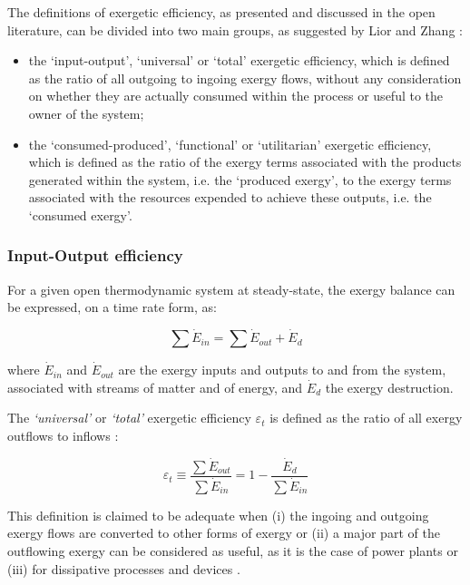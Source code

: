 \documentclass[times,3p]{elsarticle}
\begin{document}
The definitions of exergetic efficiency, as presented and discussed in the open literature, can be divided into two main groups, as suggested by Lior and Zhang \cite{Lior2007}:

\begin{itemize}
	\item the `input-output', `universal' or `total' exergetic efficiency, which is defined as the ratio of all outgoing to ingoing exergy flows, without any consideration on whether they are actually consumed within the process or useful to the owner of the system;
	\item the `consumed-produced', `functional' or `utilitarian' exergetic efficiency, which is defined as the ratio of the exergy terms associated with the products generated within the system, i.e. the `produced exergy', to the exergy terms associated with the resources expended to achieve these outputs, i.e. the `consumed exergy'.
\end{itemize}

\subsubsection{Input-Output efficiency}

For a given open thermodynamic system at steady-state, the exergy balance can be expressed, on a time rate form, as:

\begin{equation}
	\sum \dot{E}_{in} = \sum \dot{E}_{out}+\dot{E}_d
\end{equation}

	where $\dot{E}_{in}$ and $\dot{E}_{out}$ are the exergy inputs and outputs to and from the system, associated with streams of matter and of energy, and $\dot{E}_d$ the exergy destruction.  

The \emph{`universal'} or \emph{`total'} exergetic efficiency $\varepsilon_t$ is defined as the ratio of all exergy outflows to inflows \cite{Cornelissen1997,Lior2007,Wall2004}:

\begin{equation}
	\varepsilon_t \equiv \frac{\sum \dot{E}_{out}}{\sum \dot{E}_{in}} = 1-\frac{\dot{E}_d}{\sum \dot{E}_{in}}
\end{equation}

This definition is claimed to be adequate when (i) the ingoing and outgoing exergy flows are converted to other forms of exergy \cite{Cornelissen1997} or (ii) a major part of the outflowing exergy can be considered as useful, as it is the case of power plants \cite{Lior2007} or (iii) for dissipative processes and devices \cite{Moran1989,Kotas1995}. 
\end{document}
